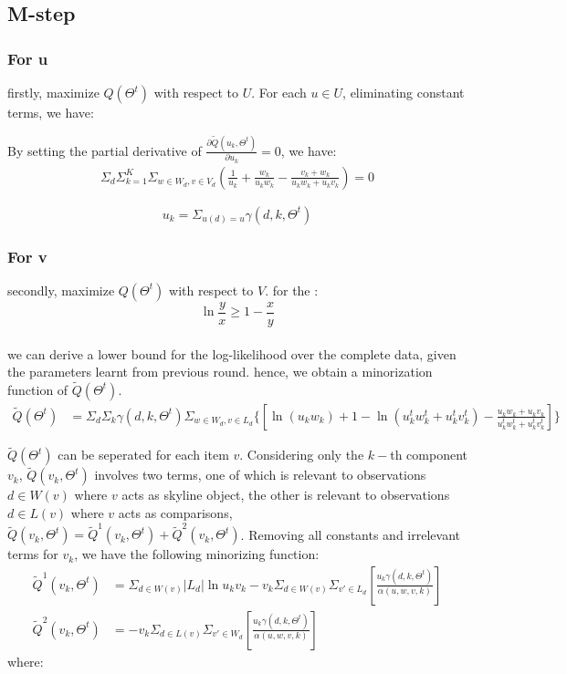 \documentclass{article}
\begin{document}
\subsection{M-step}
\subsubsection{For u}
firstly, maximize $Q(\Theta^t)$ with respect to $U$. For each $u \in U$, eliminating constant terms, we have:

By setting the partial derivative of $\frac{\partial \tilde{Q}(u_k,\Theta^t)}{\partial u_k}=0$, we have:
\begin{align}
\Sigma_{d} \Sigma_{k=1}^K \Sigma_{w\in W_d, v\in V_d}(\frac{1}{u_k}+\frac{ w_k}{u_k w_k}-\frac{v_k+w_k}{u_k w_k+u_k v_k}) = 0
\end{align}

\begin{equation}
u_k =\Sigma_{u(d)=u}\gamma(d,k,\Theta^t)
\end{equation}

\subsubsection{For v}
secondly, maximize $Q(\Theta^t)$ with respect to $V$.
for the :
\begin{equation*}
\ln \frac{y}{x} \geq 1- \frac{x}{y}
\end{equation*}\\
we can derive a lower bound for the log-likelihood over the complete data, given the parameters learnt from previous round.
hence, we obtain a minorization function of $\tilde{Q}(\Theta^t)$.\\
\begin{equation}
\begin{aligned}
\tilde{Q}(\Theta^t) &=\Sigma_d \Sigma_k \gamma(d,k,\Theta^t) \Sigma_{w\in W_d, v\in L_d}  \{[\ln (u_k w_k) + 1 - \ln (u_k^t w_k^t+u_k^t v_k^t) - \frac{u_k w_k+u_k v_k}{u_k^t w_k^t+u_k^t v_k^t}]\}
\end{aligned}
\end{equation}


$\tilde{Q}(\Theta^t)$ can be seperated for each item $v$. Considering only the $k-$th component $v_k$, $\tilde{Q}(v_k,\Theta^t)$ involves two terms, one of which is relevant to observations $d\in W(v)$ where $v$ acts as skyline object, the other is relevant to observations $d \in L(v)$ where $v$ acts as comparisons, $\tilde{Q}(v_k,\Theta^t)=\tilde{Q}^1(v_k,\Theta^t)+\tilde{Q}^2(v_k,\Theta^t)$. Removing all constants and irrelevant terms for $v_k$, we have the following minorizing function:
\begin{equation}
\begin{aligned}
\tilde{Q}^1(v_k,\Theta^t) & =\Sigma_{d\in W(v)} |L_d| \ln u_k v_k -v_k\Sigma_{d\in W(v)}\Sigma_{v'\in L_d} [\frac{u_k \gamma(d,k,\Theta^t)}{ \alpha(u,w,v,k)}]\\ \nonumber
\tilde{Q}^2(v_k,\Theta^t) & =-v_k \Sigma_{d\in L(v)}\Sigma_{v'\in W_d} [\frac{u_k \gamma(d,k,\Theta^t)}{\alpha(u,w,v,k)}]
\end{aligned}
\end{equation}
 where:\\
\end{document}
